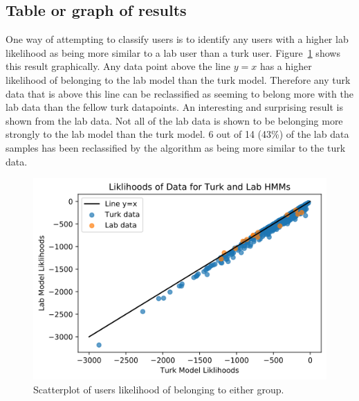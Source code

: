 \documentclass{article}
\begin{document}
\subsection{Table or graph of results}

One way of attempting to classify users is to identify any users with a higher lab likelihood as being more similar to a lab user than a turk user.
Figure~\ref{fig:unreclassified} shows this result graphically.
Any data point above the line $y=x$ has a higher likelihood of belonging to the lab model than the turk model.
Therefore any turk data that is above this line can be reclassified as seeming to belong more with the lab data than the fellow turk datapoints. 
An interesting and surprising result is shown from the lab data.
Not all of the lab data is shown to be belonging more strongly to the lab model than the turk model.
6 out of 14 (43\%) of the lab data samples has been reclassified by the algorithm as being more similar to the turk data.

\begin{figure}[ht!]
    \centering
    \includegraphics[scale=0.5]{Images/labturklikli.png}
    \caption{Scatterplot of users likelihood of belonging to either group. }
    \label{fig:unreclassified}
\end{figure}
\end{document}
